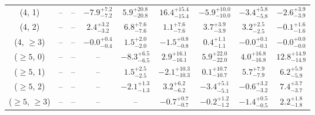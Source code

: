 \begin{table}[h!]
{\begin{tabular}{ccccccccc}
	(4, 1) & -- & -- & $-7.9^{+ 7.2 }_{- 7.2 }$ & $5.9^{+ 20.8 }_{- 20.8 }$ & $16.4^{+ 15.4 }_{- 15.4 }$ & $-5.9^{+ 10.0 }_{- 10.0 }$ & $-3.4^{+ 5.8 }_{- 5.8 }$ & $-2.6^{+ 3.9 }_{- 3.9 }$ \\[0.5ex] 
	(4, 2) & -- & -- & $2.4^{+ 3.2 }_{- 3.2 }$ & $6.8^{+ 7.6 }_{- 7.6 }$ & $1.1^{+ 7.6 }_{- 7.6 }$ & $3.7^{+ 3.9 }_{- 3.9 }$ & $3.2^{+ 2.5 }_{- 2.5 }$ & $-0.1^{+ 1.6 }_{- 1.6 }$ \\[0.5ex] 
	(4, $\ge3$) & -- & -- & $-0.0^{+ 0.4 }_{- 0.4 }$ & $1.5^{+ 2.0 }_{- 2.0 }$ & $-1.5^{+ 0.8 }_{- 0.8 }$ & $0.4^{+ 1.1 }_{- 1.1 }$ & $-0.0^{+ 0.1 }_{- 0.1 }$ & $-0.0^{+ 0.0 }_{- 0.0 }$ \\[0.5ex] 
	($\ge5$, 0) & -- & -- & -- & $-8.3^{+ 6.5 }_{- 6.5 }$ & $2.9^{+ 16.1 }_{- 16.1 }$ & $5.9^{+ 22.0 }_{- 22.0 }$ & $4.0^{+ 16.8 }_{- 16.8 }$ & $12.8^{+ 14.9 }_{- 14.9 }$ \\[0.5ex] 
	($\ge5$, 1) & -- & -- & -- & $1.5^{+ 2.5 }_{- 2.5 }$ & $-2.1^{+ 10.3 }_{- 10.3 }$ & $0.1^{+ 10.7 }_{- 10.7 }$ & $5.7^{+ 7.9 }_{- 7.9 }$ & $6.2^{+ 5.9 }_{- 5.9 }$ \\[0.5ex] 
	($\ge5$, 2) & -- & -- & -- & $-2.1^{+ 1.3 }_{- 1.3 }$ & $3.2^{+ 6.2 }_{- 6.2 }$ & $-3.4^{+ 5.1 }_{- 5.1 }$ & $-0.6^{+ 3.2 }_{- 3.2 }$ & $7.4^{+ 3.7 }_{- 3.7 }$ \\[0.5ex] 
	($\ge5$, $\ge3$) & -- & -- & -- & -- & $-0.7^{+ 0.7 }_{- 0.7 }$ & $-0.2^{+ 1.2 }_{- 1.2 }$ & $-1.4^{+ 0.5 }_{- 0.5 }$ & $2.2^{+ 1.8 }_{- 1.8 }$ \\[0.5ex] 
	\hline
	\hline
\end{tabular}}
\end{table}
